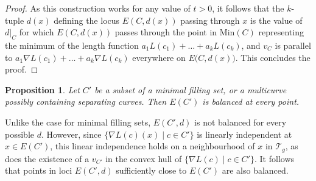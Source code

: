 \documentclass[11pt]{article}
\numberwithin{equation}{section}
\numberwithin{equation}{section}
\newtheorem{Proposition}[Theorem]{Proposition}
\begin{document}
\begin{proof}
As this construction works for any value of $t>0$, it follows that the $k$-tuple $d(x)$ defining the locus $E(C,d(x))$ passing through $x$ is the value of $d|_{C}$ for which $E(C, d(x))$ passes through the point in $\mathrm{Min}(C)$ representing the minimum of the length function $a_{1}L(c_{1})+\dots+a_{k} L(c_{k})$, and $v_{C}$ is parallel to $a_{1}\nabla L(c_{1})+\dots+a_{k}\nabla L(c_{k})$ everywhere on $E\big(C,d(x)\big)$. This concludes the proof.
\end{proof}

\begin{Proposition}
\label{balancedlemnonfilling}
Let $C'$ be a subset of a minimal filling set, or a multicurve possibly containing separating curves. Then $E(C')$ is balanced at every point.
\end{Proposition}

\begin{Remark}
\label{balancednearby}
Unlike the case for minimal filling sets, $E(C',d)$ is not balanced for every possible $d$. However, since $\{\nabla L(c)(x) \mid c\in C'\}$ is linearly independent at $x\in E(C')$, this linear independence holds on a neighbourhood of $x$ in $\mathcal{T}_{g}$, as does the existence of a $v_{C'}$ in the convex hull of $\{\nabla L(c) \mid c\in C'\}$. It follows that points in loci $E(C',d)$ sufficiently close to $E(C')$ are also balanced.
\end{Remark}
\end{document}
